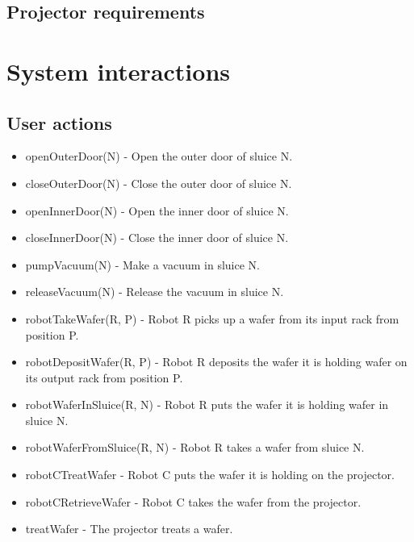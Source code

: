 \documentclass[12pt]{report}
\begin{document}
	\section{Projector requirements}
	\begin{itemize}
	\end{itemize}
	
	\chapter{System interactions}
\section{User actions}
	\begin{itemize}
\item openOuterDoor(N) - Open the outer door of sluice N.
\item closeOuterDoor(N) - Close the outer door of sluice N.
\item openInnerDoor(N) - Open the inner door of sluice N.
\item closeInnerDoor(N) - Close the inner door of sluice N.
\item pumpVacuum(N) - Make a vacuum in sluice N.
\item releaseVacuum(N) - Release the vacuum in sluice N.
\item robotTakeWafer(R, P) - Robot R picks up a wafer from its input rack from position P.
\item robotDepositWafer(R, P) - Robot R deposits the wafer it is holding wafer on its output rack from position P.
\item robotWaferInSluice(R, N) - Robot R puts the wafer it is holding wafer in sluice N.
\item robotWaferFromSluice(R, N) - Robot R takes a wafer from sluice N.
\item robotCTreatWafer - Robot C puts the wafer it is holding on the projector.
\item robotCRetrieveWafer - Robot C takes the wafer from the projector.
\item treatWafer - The projector treats a wafer.
\end{itemize}
\end{document}
